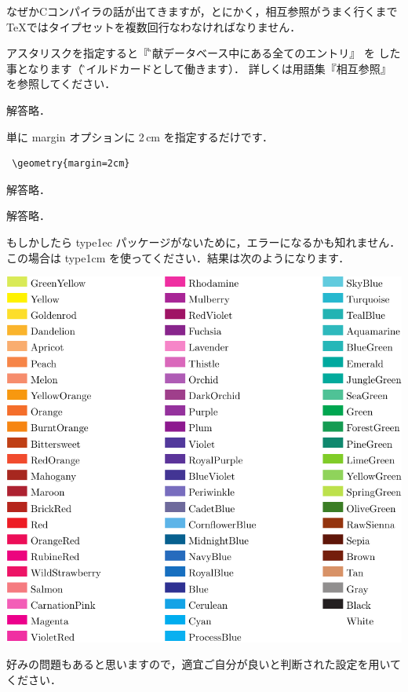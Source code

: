 \begin{description}
なぜかCコンパイラの話が出てきますが，とにかく，相互参照がうまく行くまで
\TeX ではタイプセットを複数回行なわなければなりません．

 アスタリスクを指定すると『\G{文献データベース}中にある全てのエントリ』
 を  した事となります（\G{ワイルドカード}として働きます）．
詳しくは用語集『相互参照』を参照してください．
\end{description}


\begin{description}
解答略．

単に margin オプションに 2\,cm を指定するだけです．
\begin{verbatim}
 \geometry{margin=2cm}
\end{verbatim}

解答略．

解答略．

もしかしたら type1ec パッケージがないために，エラーになるかも知れません．
この場合は type1cm を使ってください．結果は次のようになります．
\begin{center}
 \includegraphics[bb=0 0 392 362,width=\linewidth]{8.6.pdf}
\end{center}

好みの問題もあると思いますので，適宜ご自分が良いと判断された設定を用いて
ください．


\end{description}
